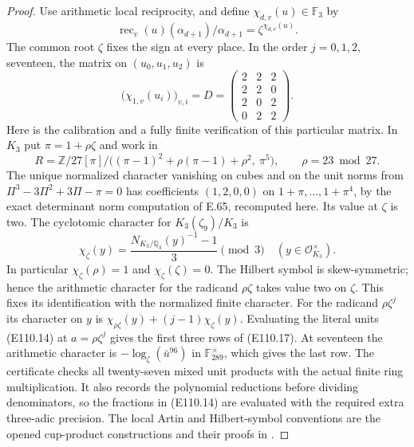 \begin{proof}
Use arithmetic local reciprocity, and define
$\chi_{d,v}(u)\in\mathbb F_3$ by
\[
 \operatorname{rec}_v(u)(\alpha_{d+1})/\alpha_{d+1}
      =\zeta^{\chi_{d,v}(u)}.
 \tag{E110.16}
\]
The common root $\zeta$ fixes the sign at every place.
In the order $j=0,1,2$, seventeen, the matrix on
$(u_0,u_1,u_2)$ is
\[
 \bigl(\chi_{1,v}(u_i)\bigr)_{v,i}=
 D=
 \begin{pmatrix}
  2&2&2\\
  2&2&0\\
  2&0&2\\
  0&2&2
 \end{pmatrix}.
 \tag{E110.17}
\]
Here is the calibration and a fully finite verification of this
particular matrix. In $K_3$ put $\pi=1+\rho\zeta$ and work in
\[
  R=\mathbb Z/27[\pi]\big/
       \bigl((\pi-1)^2+\rho(\pi-1)+\rho^2,\ \pi^5\bigr),
       \qquad \rho=23\bmod27 .
 \tag{E110.18}
\]
The unique normalized character vanishing on cubes and on the
unit norms from
$\Pi^3-3\Pi^2+3\Pi-\pi=0$
has coefficients $(1,2,0,0)$ on
$1+\pi,\ldots,1+\pi^4$, by the exact determinant norm computation
of E.65, recomputed here.
Its value at $\zeta$ is two.
The cyclotomic character for $K_3(\zeta_9)/K_3$ is
\[
 \chi_\zeta(y)
    =\frac{N_{K_3/\mathbb Q_3}(y)^{-1}-1}{3}\pmod3
                    \quad(y\in\mathcal O_{K_3}^{\times}).
 \tag{E110.19}
\]
In particular $\chi_\zeta(\rho)=1$ and
$\chi_\zeta(\zeta)=0$.
The Hilbert symbol is skew-symmetric; hence the arithmetic
character for the radicand $\rho\zeta$ takes value two on $\zeta$.
This fixes its identification with the normalized finite character.
For the radicand $\rho\zeta^j$ its character on $y$ is
$\chi_{\rho\zeta}(y)+(j-1)\chi_\zeta(y)$.
Evaluating the literal units (E110.14) at
$a=\rho\zeta^j$ gives the first three rows of (E110.17).
At seventeen the arithmetic character is
$-\log_\zeta(\bar u^{96})$ in $\mathbb F_{289}^{\times}$,
which gives the last row. The certificate checks all twenty-seven
mixed unit products with the actual finite ring multiplication.
It also records the polynomial reductions before dividing
denominators, so the fractions in (E110.14) are evaluated with the
required extra three-adic precision.
The local Artin and Hilbert-symbol conventions are the opened
cup-product constructions and their proofs in
\cite[III, Theorems3.1,4.4 and the intervening norm compatibility]{E_MilneCFT}.


\end{proof}
